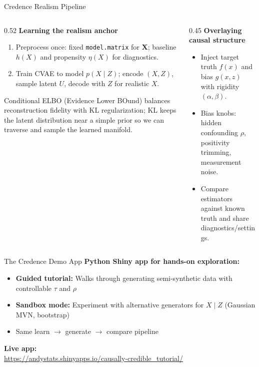 \documentclass[aspectratio=169]{beamer}
\begin{document}
\begin{frame}{Credence Realism Pipeline}
  \small
  \begin{columns}[T,totalwidth=\textwidth]
    \begin{column}{0.52\textwidth}
      \textbf{Learning the realism anchor}
      \begin{enumerate}
        \item Preprocess once: fixed \texttt{model.matrix} for \(\mathbf X\); baseline $h(X)$ and propensity $\eta(X)$ for diagnostics.
        \item Train CVAE to model \(p(X\mid Z)\); encode $(X,Z)$, sample latent $U$, decode with $Z$ for realistic $X$.
      \end{enumerate}
      \vspace{0.4em}
      \small Conditional ELBO (Evidence Lower BOund) balances reconstruction fidelity with KL regularization; KL keeps the latent distribution near a simple prior so we can traverse and sample the learned manifold.
    \end{column}
    \begin{column}{0.45\textwidth}
      \textbf{Overlaying causal structure}
      \begin{itemize}
        \item Inject target truth $f(x)$ and bias $g(x,z)$ with rigidity $(\alpha,\beta)$.
        \item Bias knobs: hidden confounding $\rho$, positivity trimming, measurement noise.
        \item Compare estimators against known truth and share diagnostics/settings.
      \end{itemize}
    \end{column}
  \end{columns}
\end{frame}

\begin{frame}{The Credence Demo App}
  \small
  \textbf{Python Shiny app for hands-on exploration:}
  \begin{itemize}
    \item \textbf{Guided tutorial:} Walks through generating semi-synthetic data with controllable $\tau$ and $\rho$
    \item \textbf{Sandbox mode:} Experiment with alternative generators for $X \mid Z$ (Gaussian MVN, bootstrap)
    \item Same learn $\rightarrow$ generate $\rightarrow$ compare pipeline
  \end{itemize}
  \vspace{1em}

  \centering
  \textbf{Live app:}\\[0.5em]
  \url{https://andystats.shinyapps.io/causally-credible_tutorial/}
\end{frame}
\end{document}
